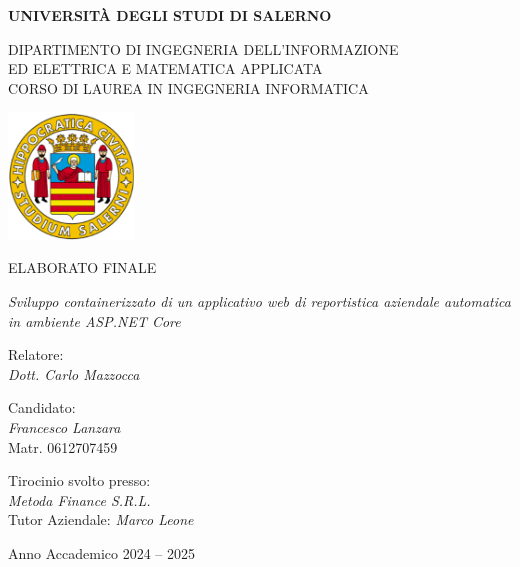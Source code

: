 


\begin{center}
		\textbf{\Large{UNIVERSITÀ DEGLI STUDI DI SALERNO}}

	\vspace{0.5cm}
	\large DIPARTIMENTO DI INGEGNERIA DELL'INFORMAZIONE \\
	ED ELETTRICA E MATEMATICA APPLICATA \\
	\vspace{0.2cm}
	CORSO DI LAUREA IN INGEGNERIA INFORMATICA
	\vspace{1cm}

	\includegraphics[width=0.25\textwidth]{fig/Logo_Unisa.png}
	\vspace{1cm}

	\large ELABORATO FINALE
	\vspace{0.5cm}

	\emph{\LARGE Sviluppo containerizzato di un applicativo web di reportistica aziendale automatica in ambiente ASP.NET Core}
	\vspace{1.5cm}
\end{center}

\noindent
\begin{minipage}[t]{0.45\textwidth}
	Relatore: \\
	\emph{Dott. Carlo Mazzocca}
\end{minipage}
\hfill
\begin{minipage}[t]{0.45\textwidth}
	Candidato: \\
	\emph{Francesco Lanzara} \\
	Matr. 0612707459
\end{minipage}

\vspace{0.8cm}
\noindent
Tirocinio svolto presso: \\
\emph{Metoda Finance S.R.L.} \\
Tutor Aziendale: \emph{Marco Leone}

\vspace{3,5cm}
\begin{center}
	Anno Accademico 2024 -- 2025
\end{center}